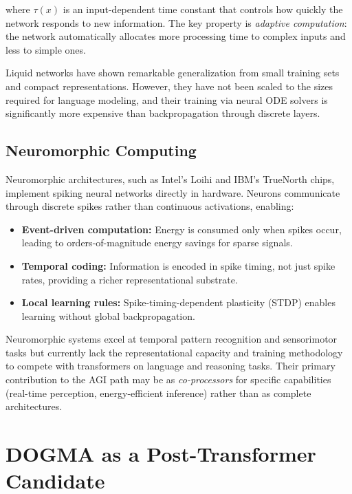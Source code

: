 where $\tau(x)$ is an input-dependent time constant that controls how quickly the network responds to new information. The key property is \emph{adaptive computation}: the network automatically allocates more processing time to complex inputs and less to simple ones.

Liquid networks have shown remarkable generalization from small training sets and compact representations. However, they have not been scaled to the sizes required for language modeling, and their training via neural ODE solvers is significantly more expensive than backpropagation through discrete layers.

\subsection{Neuromorphic Computing}

Neuromorphic architectures, such as Intel's Loihi and IBM's TrueNorth chips, implement spiking neural networks directly in hardware. Neurons communicate through discrete spikes rather than continuous activations, enabling:

\begin{itemize}[leftmargin=1.8em]
  \item \textbf{Event-driven computation:} Energy is consumed only when spikes occur, leading to orders-of-magnitude energy savings for sparse signals.
  \item \textbf{Temporal coding:} Information is encoded in spike timing, not just spike rates, providing a richer representational substrate.
  \item \textbf{Local learning rules:} Spike-timing-dependent plasticity (STDP) enables learning without global backpropagation.
\end{itemize}

Neuromorphic systems excel at temporal pattern recognition and sensorimotor tasks but currently lack the representational capacity and training methodology to compete with transformers on language and reasoning tasks. Their primary contribution to the AGI path may be as \emph{co-processors} for specific capabilities (real-time perception, energy-efficient inference) rather than as complete architectures.

\section{DOGMA as a Post-Transformer Candidate}
\label{sec:dogma-candidate}

